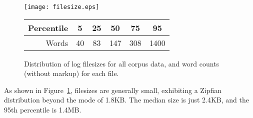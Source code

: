 \begin{figure}[h]
    \centering
    \texttt{[image: filesize.eps]}


    \begin{tabular}{ | r | c | c | c | c | c | }
        \hline
        Percentile & 5 & 25 & 50 & 75 & 95 \\ \hline
        Words & 40 & 83 & 147 & 308 & 1400 \\ \hline
    \end{tabular}

    \caption{Distribution of log filesizes for all corpus data, and word counts (without markup) for each file.}
    \label{fig:filesizes}
\end{figure}



As shown in Figure~\ref{fig:filesizes}, filesizes are generally small, exhibiting a Zipfian distribution beyond the mode of 1.8KB.  The median size is just 2.4KB, and the 95th percentile is 1.4MB.




